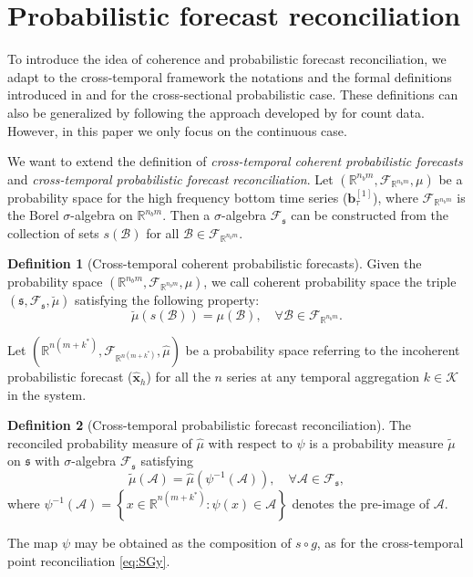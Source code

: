 \documentclass[a4paper,11pt]{article}
\newcommand{\bvet}{\bm{b}}
\newcommand{\xvet}{\bm{x}}
\theoremstyle{definition}
\newtheorem{definition}{Definition}[section]
\begin{document}
\section{Probabilistic forecast reconciliation}\label{sec:prob}

To introduce the idea of coherence and probabilistic forecast reconciliation, we adapt to the cross-temporal framework the notations and the formal definitions introduced in \cite{wickramasuriya2021b} and \cite{panagiotelis2023} for the cross-sectional probabilistic case. These definitions can also be generalized by following the approach developed by \cite{corani2022} for count data. However, in this paper we only focus on the continuous case.

We want to extend the definition of \textit{cross-temporal coherent probabilistic forecasts} and \textit{cross-temporal probabilistic forecast reconciliation}.
Let $\left(\mathbb{R}^{n_b m}, \mathcal{F}_{\mathbb{R}^{n_b m}}, \mu\right)$ be a probability space for the high frequency bottom time series ($\bvet_{\tau}^{[1]}$), where $\mathcal{F}_{\mathbb{R}^{n_b m}}$ is the Borel $\sigma$-algebra on $\mathbb{R}^{n_b m}$. Then a $\sigma$-algebra $\mathcal{F}_{\mathfrak{s}}$ can be constructed from the collection of sets $s(\mathcal{B})$ for all $\mathcal{B} \in \mathcal{F}_{\mathbb{R}^{n_b m}}$.
\begin{definition}[Cross-temporal coherent probabilistic forecasts]
	Given the probability space $\left(\mathbb{R}^{n_b m}, \mathcal{F}_{\mathbb{R}^{n_b m}}, \mu\right)$, we call coherent probability space the triple $\left(\mathfrak{s}, \mathcal{F}_{\mathfrak{s}}, \breve{\mu}\right)$ satisfying the following property:
	$$
		\breve{\mu}(s(\mathcal{B}))=\mu(\mathcal{B}), \quad \forall \mathcal{B} \in \mathcal{F}_{\mathbb{R}^{n_b m}} .
	$$
\end{definition}
Let $\left(\mathbb{R}^{n(m+k^\ast)}, \mathcal{F}_{\mathbb{R}^{n(m+k^\ast)}}, \hat{\mu}\right)$ be a probability space referring to the incoherent probabilistic forecast ($\widehat{\xvet}_{h}$) for all the $n$ series at any temporal aggregation $k \in \mathcal{K}$ in the system.
\begin{definition}[Cross-temporal probabilistic forecast reconciliation]\label{def:pfr}
	The reconciled probability measure of $\hat{\mu}$ with respect to $\psi$ is a probability measure $\tilde{\mu}$ on $\mathfrak{s}$ with $\sigma$-algebra $\mathcal{F}_{\mathfrak{s}}$ satisfying
	\begin{equation}\label{eq:pfr}
		\tilde{\mu}(\mathcal{A})=\hat{\mu}\left(\psi^{-1}(\mathcal{A})\right), \quad \forall \mathcal{A} \in \mathcal{F}_{\mathfrak{s}},
	\end{equation}
	where $\psi^{-1}(\mathcal{A})=\left\{x \in \mathbb{R}^{n(m+k^\ast)}: \psi(x) \in \mathcal{A}\right\}$ denotes the pre-image of $\mathcal{A}$.
\end{definition}
The map $\psi$ may be obtained as the composition of $s \circ g$, as for the cross-temporal point reconciliation \eqref{eq:SGy}.
\end{document}
